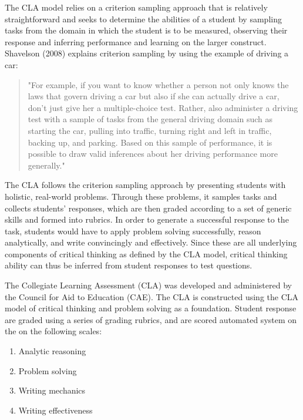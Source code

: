 The CLA model relies on a criterion sampling approach that is relatively straightforward and seeks to determine the abilities of a student by sampling tasks from the domain in which the student is to be measured, observing their response and inferring performance and learning on the larger construct. Shavelson (2008) explains criterion sampling by using the example of driving a car:

\begin{quote}
"For example, if you want to know whether a person not only knows the laws that govern driving a car but also if she can actually drive a car, don’t just give her a multiple-choice test. Rather, also administer a driving test with a sample of tasks from the general driving domain such as starting the car, pulling into traffic, turning right and left in traffic, backing up, and parking. Based on this sample of performance, it is possible to draw valid inferences about her driving performance more generally."
\end{quote}

The CLA follows the criterion sampling approach by presenting students with holistic, real-world problems. Through these problems, it samples tasks and collects students’ responses, which are then graded according to a set of generic skills and formed into rubrics. In order to generate a successful response to the task, students would have to apply problem solving successfully, reason analytically, and write convincingly and effectively. Since these are all underlying components of critical thinking as defined by the CLA model, critical thinking ability can thus be inferred from student responses to test questions.

The Collegiate Learning Assessment (CLA) was developed and administered by the Council for Aid to Education (CAE).  The CLA is constructed using the CLA model of critical thinking and problem solving as a foundation. Student response are graded using a series of grading rubrics, and are scored automated system on the on the following scales\cite{Shavelson:2008vo}:

\begin{enumerate}
\item Analytic reasoning
\item Problem solving
\item Writing mechanics
\item Writing effectiveness
\end{enumerate}
